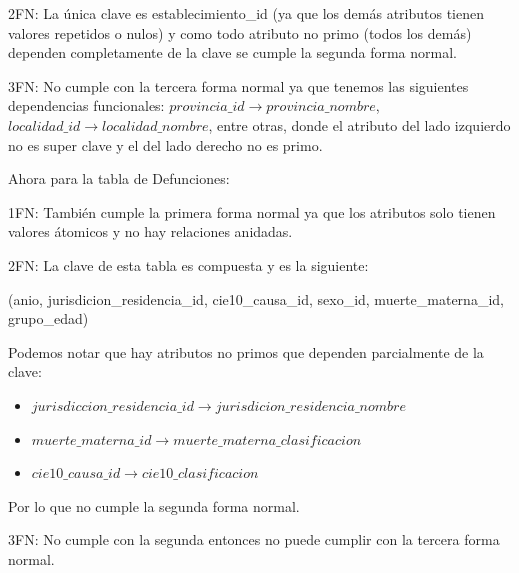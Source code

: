 \documentclass[11pt,a4paper]{article}
\begin{document}
2FN: La única clave es establecimiento\_id (ya que los demás atributos tienen valores repetidos o nulos) y como todo atributo no primo (todos los demás) dependen completamente de la clave se cumple la segunda forma normal.

3FN: No cumple con la tercera forma normal ya que tenemos las siguientes dependencias funcionales: $provincia\_id \rightarrow provincia\_nombre$, $localidad\_id \rightarrow localidad\_nombre$, entre otras, donde el atributo del lado izquierdo no es super clave y el del lado derecho no es primo.

Ahora para la tabla de Defunciones:

1FN: También cumple la primera forma normal ya que los atributos solo tienen valores átomicos y no hay relaciones anidadas.

2FN: La clave de esta tabla es compuesta y es la siguiente:

(anio, jurisdicion\_residencia\_id, cie10\_causa\_id, sexo\_id, muerte\_materna\_id, grupo\_edad)

Podemos notar que hay atributos no primos que dependen parcialmente de la clave:

\begin{itemize}
	\item $jurisdiccion\_residencia\_id \rightarrow jurisdicion\_residencia\_nombre$
	\item $muerte\_materna\_id \rightarrow muerte\_materna\_clasificacion$
	\item $cie10\_causa\_id \rightarrow cie10\_clasificacion$	
\end{itemize}

Por lo que no cumple la segunda forma normal.

3FN: No cumple con la segunda entonces no puede cumplir con la tercera forma normal. 

\newpage
\end{document}
